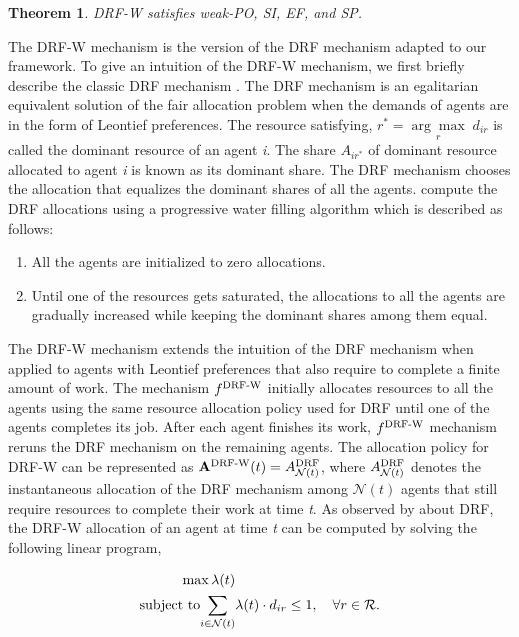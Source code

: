 \documentclass[letterpaper]{article} %
\newtheorem{theorem}{Theorem}
\theoremstyle{definition}
\begin{document}
\begin{theorem} \label{drf-w_properties}
DRF-W satisfies weak-PO, SI, EF, and SP.
\end{theorem}

\iffalse
The DRF-W mechanism is the version of the DRF mechanism adapted to our framework. To give an intuition of the DRF-W mechanism, we first briefly describe the classic DRF mechanism \cite{Ghodsi2011drf,parkes2015beyond}.
The DRF mechanism is an egalitarian equivalent solution of the fair allocation problem when the demands of agents are in the form of Leontief preferences.
The resource satisfying, $r^{*} = \underset{r}{\arg \max} \; d_{ir}$ is called the dominant resource of an agent \textit{i}. The share $A_{ir^{*}}$ of dominant resource allocated to agent \textit{i} is known as its dominant share. The DRF mechanism chooses the allocation that  equalizes the dominant shares of all the agents. \citeauthor{Ghodsi2011drf}  compute the DRF allocations using a  progressive water filling algorithm which is described as follows: 
\begin{enumerate}
    \item All the agents are initialized to zero allocations.
    \item Until one of the resources gets saturated, the allocations to all the agents are gradually increased while keeping the dominant shares among them equal.
\end{enumerate}

The DRF-W mechanism extends the intuition of the DRF mechanism when applied to agents with Leontief preferences that also require to complete a finite amount of work. The mechanism $f^{\textnormal{DRF-W}}$ initially allocates resources to all the agents using the same resource allocation policy used for DRF until one of the agents completes its job. After each agent finishes its work, ${f}^{\textnormal{DRF-W}}$ mechanism reruns the DRF mechanism on the remaining agents. The allocation policy for DRF-W can be represented as $ \mathbf{A}^{\textnormal{DRF-W}}(t) = {A}^{\textnormal{DRF}}_{\mathcal{N}(t)}$, where ${A}^{\textnormal{DRF}}_{\mathcal{N}(t)}$ denotes the instantaneous allocation of the DRF mechanism among $\mathcal{N}(t)$ agents that still require resources to complete their work at time \textit{t}. As observed by
\citeauthor{parkes2015beyond}  about DRF, the DRF-W allocation of an agent at time \textit{t} can be computed by solving the following linear program,
\begin{linenomath}
\begin{align*} \label{eq:1}
\begin{split}
\max \lambda(t) & 
\\ \textnormal{subject to} \underset{i \in \mathcal{N}(t)}{\displaystyle \sum} & \lambda(t) \cdot d_{ir} \leq 1, \quad \forall r \in \mathcal{R}.    
\end{split}
\end{align*}
\end{linenomath}
\end{document}
